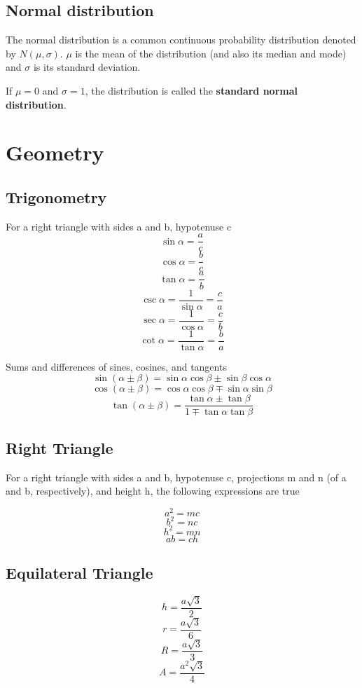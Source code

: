 \documentclass[oneside]{book}
\newcommand*\reciprocal[1]{\frac{1}{#1}}
\begin{document}
\section{Normal distribution}
The normal distribution is a common continuous probability distribution denoted
by \(N(\mu, \sigma)\). \(\mu\) is the mean of the distribution (and also its
median and mode) and \(\sigma\) is its standard deviation.

If \(\mu = 0\) and \(\sigma = 1\), the distribution is called the
\textbf{standard normal distribution}.

\chapter{Geometry}

\section{Trigonometry}

For a right triangle with sides a and b, hypotenuse c
\[\sin{\alpha} = \frac{a}{c}\]
\[\cos{\alpha} = \frac{b}{c}\]
\[\tan{\alpha} = \frac{a}{b}\]
\[\csc{\alpha} = \reciprocal{\sin{\alpha}} = \frac{c}{a}\]
\[\sec{\alpha} = \reciprocal{\cos{\alpha}} = \frac{c}{b}\]
\[\cot{\alpha} = \reciprocal{\tan{\alpha}} = \frac{b}{a}\]

Sums and differences of sines, cosines, and tangents
\[{\sin{\left( \alpha \pm \beta \right)} =
  \sin{\alpha}\cos{\beta} \pm \sin{\beta}\cos{\alpha}}\]
\[{\cos{\left( \alpha \pm \beta \right)} =
  \cos{\alpha}\cos{\beta} \mp \sin{\alpha}\sin{\beta}}\]
\[{\tan{\left( \alpha \pm \beta \right)} =
  \frac{\tan{\alpha} \pm \tan{\beta}}{1 \mp \tan{\alpha} \tan{\beta}}}\]

\section{Right Triangle}
For a right triangle with sides a and b, hypotenuse c, projections m and n (of
a and b, respectively), and height h,
the following expressions are true

\[a^2 = m c\]
\[b^2 = n c\]
\[h^2 = m n\]
\[a b = c h\]

\section{Equilateral Triangle}
\[h = \frac{a \sqrt{3}}{2}\]
\[r = \frac{a \sqrt{3}}{6}\]
\[R = \frac{a \sqrt{3}}{3}\]
\[A = \frac{a^2 \sqrt{3}}{4}\]
\end{document}
